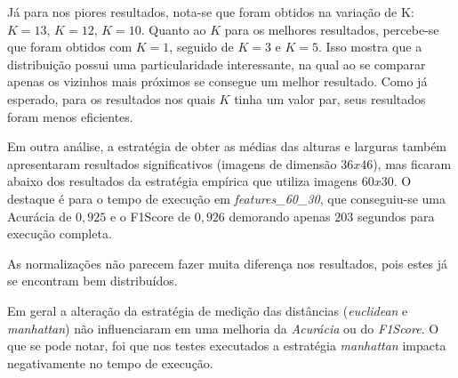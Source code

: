 \documentclass[12pt]{article}
\begin{document}
Já para nos piores resultados, nota-se que foram obtidos na variação de K: $K=13$, $K=12$, $K=10$. Quanto ao $K$ para os melhores resultados, percebe-se que foram obtidos com $K=1$, seguido de $K=3$ e $K=5$. Isso mostra que a distribuição possui uma particularidade interessante, na qual ao se comparar apenas os vizinhos mais próximos se consegue um melhor resultado. Como já esperado, para os resultados nos quais $K$ tinha um valor par, seus resultados foram menos eficientes.

Em outra análise, a estratégia de obter as médias das alturas e larguras também apresentaram resultados significativos (imagens de dimensão $36x46$), mas ficaram abaixo dos resultados da estratégia empírica que utiliza imagens $60x30$. O destaque é para o tempo de execução em \textit{features\_60\_30}, que conseguiu-se uma Acurácia de $0,925$ e o F1Score de $0,926$ demorando apenas $203$ segundos para execução completa.

As normalizações não parecem fazer muita diferença nos resultados, pois estes já se encontram bem distribuídos.

Em geral a alteração da estratégia de medição das distâncias (\textit{euclidean} e \textit{manhattan}) não influenciaram em uma melhoria da \textit{Acurácia} ou do \textit{F1Score}. O que se pode notar, foi que nos testes executados a estratégia \textit{manhattan} impacta negativamente no tempo de execução.
\end{document}
